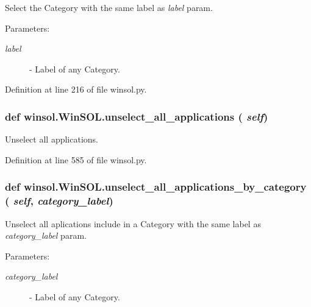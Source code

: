 Select the Category with the same label as {\em label\/} param. 

\begin{Desc}
\item[Parameters:]
\begin{description}
\item[{\em label}]- Label of any Category. \end{description}
\end{Desc}


Definition at line 216 of file winsol.py.\hypertarget{classwinsol_1_1WinSOL_251d306446f4bae66790d579da69db8c}{
\subsubsection[unselect\_\-all\_\-applications]{\setlength{\rightskip}{0pt plus 5cm}def winsol.Win\-SOL.unselect\_\-all\_\-applications ( {\em self})}}
\label{classwinsol_1_1WinSOL_251d306446f4bae66790d579da69db8c}


Unselect all applications. 



Definition at line 585 of file winsol.py.\hypertarget{classwinsol_1_1WinSOL_94e732a8185923ac882e98a457aa124e}{
\subsubsection[unselect\_\-all\_\-applications\_\-by\_\-category]{\setlength{\rightskip}{0pt plus 5cm}def winsol.Win\-SOL.unselect\_\-all\_\-applications\_\-by\_\-category ( {\em self},  {\em category\_\-label})}}
\label{classwinsol_1_1WinSOL_94e732a8185923ac882e98a457aa124e}


Unselect all aplications include in a Category with the same label as {\em category\_\-label\/} param. 

\begin{Desc}
\item[Parameters:]
\begin{description}
\item[{\em category\_\-label}]- Label of any Category. \end{description}
\end{Desc}


